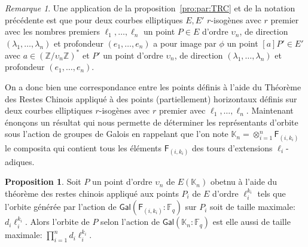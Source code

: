 \documentclass[10pt,a4paper]{book}
\theoremstyle{plain}
\theoremstyle{definition}
\theoremstyle{definition}
\theoremstyle{definition}
\newtheorem{prop}[thm]{Proposition}
\theoremstyle{definition}
\theoremstyle{remark}
\newtheorem{rem}[thm]{Remarque}
\theoremstyle{remark}
\theoremstyle{definition}
\begin{document}
\begin{rem}
Une application de la proposition~\ref{pro:par:TRC} et de la notation 
précédente est que pour deux courbes elliptiques $E,E'$ $r$-isogènes avec $r$ 
premier avec les nombres premiers $\ell_1, \dots, \ell_n$ un point $P \in E$ 
d'ordre $\upsilon_n$, de direction $(\lambda_1, \dots, \lambda_n)$ et 
profondeur $(e_1, \dots, e_n)$ a pour image par $\phi$ un point $[a]P' \in E'$
avec $a \in (\mathbb{Z}/\upsilon_n \mathbb{Z})^*$ et $P'$ un 
point d'ordre $\upsilon_n$, de direction $(\lambda_1, \dots, \lambda_n)$ et 
profondeur $(e_1, \dots, e_n)$.
\end{rem}
On a donc bien une correspondance entre les points définis à l'aide du Théorème
 des Restes Chinois appliqué à des points (partiellement) horizontaux définis 
 sur deux courbes elliptiques $r$-isogènes avec $r$ premier avec $\ell_1, \dots
 , \ell_n$.
 Maintenant énonçons un résultat qui nous permette de déterminer les 
 représentants d'orbite sous l'action de groupes de Galois en rappelant que 
 l'on note $\mathbb{K}_n=\otimes_{i=1}^{n}\mathsf{F}_{(i,k_i)}$ le composita 
 qui contient tous les éléments $\mathsf{F}_{(i,k_i)}$ des tours d'extensions
 $\ell_i$-adiques.
\begin{prop}
\label{pro:rep:com}
Soit $P$ un point d'ordre $\upsilon_n$ de $E(\mathbb{K}_n)$ obetnu à l'aide 
du théorème des restes chinois appliqué aux points $P_i$ de $E$ d'ordre 
$\ell_i^{k_i}$ tels que l'orbite générée par l'action de 
$\mathsf{Gal}(\mathsf{F}_{(i,k_i)}:\mathbb{F}_q)$ sur $P_i$ soit de taille
 maximale:$d_i\ell_i^{k_i}$.  Alors l'orbite de $P$ selon l'action de 
 $\mathsf{Gal}(\mathbb{K}_n:\mathbb{F}_q)$ est elle aussi de taille maximale:
 $\prod_{i=1}^nd_i\ell_i^{k_i}$.
\end{prop} 
\end{document}
